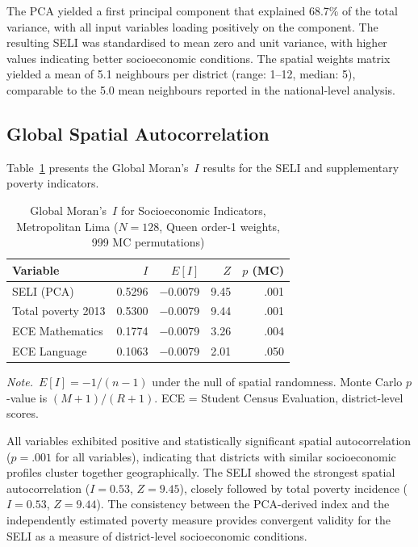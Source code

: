 \documentclass[12pt,a4paper,twoside]{article}
\begin{document}
The PCA yielded a first principal component that explained 68.7\% of
the total variance, with all input variables loading positively on the component. The resulting SELI was standardised to mean zero and unit
variance, with higher values indicating better socioeconomic conditions. The
spatial weights matrix yielded a mean of 5.1 neighbours per district
(range: 1--12, median: 5), comparable to the 5.0 mean neighbours reported
in the national-level analysis.

\subsection{Global Spatial Autocorrelation}

Table~\ref{tab:moran_global} presents the Global Moran's~$I$ results for the
SELI and supplementary poverty indicators.

\begin{table}[htbp]
  \centering
  \footnotesize
  \caption{Global Moran's~$I$ for Socioeconomic Indicators, Metropolitan Lima
           ($N = 128$, Queen order-1 weights, 999 MC permutations)}
  \label{tab:moran_global}
  \begin{tabular}{lrrrr}
    \toprule
    Variable & $I$ & $E[I]$ & $Z$ & $p$ (MC) \\
    \midrule
    SELI (PCA)          & 0.5296 & $-$0.0079 & 9.45 & .001 \\
    Total poverty 2013  & 0.5300 & $-$0.0079 & 9.44 & .001 \\
    ECE Mathematics     & 0.1774 & $-$0.0079 & 3.26 & .004 \\
    ECE Language        & 0.1063 & $-$0.0079 & 2.01 & .050 \\
    \bottomrule
  \end{tabular}

  \vspace{4pt}
  \begin{minipage}{0.9\textwidth}
  \footnotesize\textit{Note.}\ $E[I] = -1/(n-1)$ under the null of spatial
  randomness. Monte Carlo $p$-value is $(M+1)/(R+1)$.
  ECE = Student Census Evaluation, district-level scores.
  \end{minipage}
\end{table}

All variables exhibited positive and statistically significant spatial
autocorrelation ($p = .001$ for all variables), indicating that districts with
similar socioeconomic profiles cluster together geographically. The SELI showed
the strongest spatial autocorrelation ($I = 0.53$, $Z = 9.45$), closely followed
by total poverty incidence ($I = 0.53$, $Z = 9.44$). The consistency between the
PCA-derived index and the independently estimated poverty measure provides
convergent validity for the SELI as a measure of district-level socioeconomic
conditions.
\end{document}
